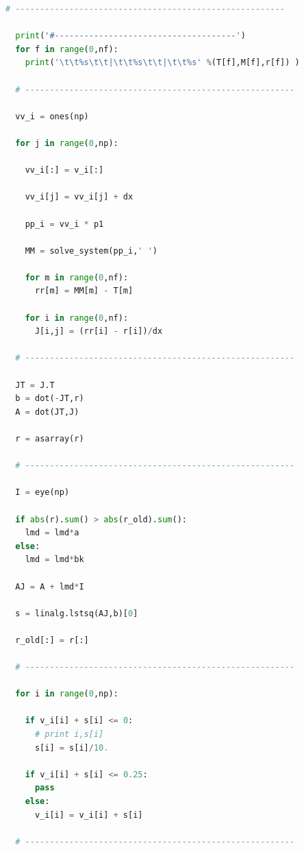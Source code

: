 \begin{lstlisting}[language=Python,caption={Процедура оптимизации на основе алгоритма Левенберга-Марквардта на языке программирования Python},label={list:optimization_routine}]
  # -------------------------------------------------------

  print('#-------------------------------------')
  for f in range(0,nf):
    print('\t\t%s\t\t|\t\t%s\t\t|\t\t%s' %(T[f],M[f],r[f]) )

  # -------------------------------------------------------

  vv_i = ones(np)

  for j in range(0,np):

    vv_i[:] = v_i[:]

    vv_i[j] = vv_i[j] + dx

    pp_i = vv_i * p1

    MM = solve_system(pp_i,' ')

    for m in range(0,nf):
      rr[m] = MM[m] - T[m] 

    for i in range(0,nf):
      J[i,j] = (rr[i] - r[i])/dx

  # -------------------------------------------------------

  JT = J.T
  b = dot(-JT,r)
  A = dot(JT,J)

  r = asarray(r)

  # -------------------------------------------------------

  I = eye(np)         

  if abs(r).sum() > abs(r_old).sum():
    lmd = lmd*a
  else:
    lmd = lmd*bk

  AJ = A + lmd*I

  s = linalg.lstsq(AJ,b)[0]

  r_old[:] = r[:]

  # -------------------------------------------------------

  for i in range(0,np):

    if v_i[i] + s[i] <= 0:
      # print i,s[i]
      s[i] = s[i]/10.

    if v_i[i] + s[i] <= 0.25:
      pass
    else:
      v_i[i] = v_i[i] + s[i]

  # -------------------------------------------------------

\end{lstlisting}

